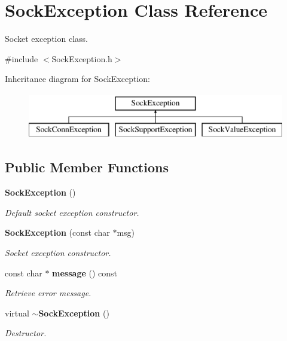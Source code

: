 \section{\-Sock\-Exception \-Class \-Reference}
\label{classSockException}


\-Socket exception class.  




{\ttfamily \#include $<$\-Sock\-Exception.\-h$>$}

\-Inheritance diagram for \-Sock\-Exception\-:\begin{figure}[H]
\begin{center}
\leavevmode
\includegraphics[height=2.000000cm]{classSockException}
\end{center}
\end{figure}
\subsection*{\-Public \-Member \-Functions}
\begin{DoxyCompactItemize}
\item 
{\bf \-Sock\-Exception} ()
\begin{DoxyCompactList}\small\item\em \-Default socket exception constructor. \end{DoxyCompactList}\item 
{\bf \-Sock\-Exception} (const char $\ast$msg)
\begin{DoxyCompactList}\small\item\em \-Socket exception constructor. \end{DoxyCompactList}\item 
const char $\ast$ {\bf message} () const 
\begin{DoxyCompactList}\small\item\em \-Retrieve error message. \end{DoxyCompactList}\item 
virtual {\bf $\sim$\-Sock\-Exception} ()
\begin{DoxyCompactList}\small\item\em \-Destructor. \end{DoxyCompactList}\end{DoxyCompactItemize}


